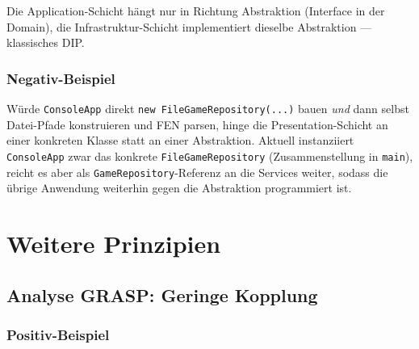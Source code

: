 \documentclass[a4paper,12pt]{article}
\let\oldsection\section
\renewcommand{\section}{\clearpage\oldsection}
\begin{document}

Die Application-Schicht hängt nur in Richtung Abstraktion (Interface in der Domain), die
Infrastruktur-Schicht implementiert dieselbe Abstraktion --- klassisches DIP.

\subsubsection*{Negativ-Beispiel}

Würde \texttt{ConsoleApp} direkt \texttt{new FileGameRepository(...)} bauen \emph{und} dann
selbst Datei-Pfade konstruieren und FEN parsen, hinge die Presentation-Schicht an einer konkreten
Klasse statt an einer Abstraktion. Aktuell instanziiert \texttt{ConsoleApp} zwar das konkrete
\texttt{FileGameRepository} (Zusammenstellung in \texttt{main}), reicht es aber als
\texttt{GameRepository}-Referenz an die Services weiter, sodass die übrige Anwendung weiterhin
gegen die Abstraktion programmiert ist.

\section{Weitere Prinzipien}

\subsection*{Analyse GRASP: Geringe Kopplung}

\subsubsection*{Positiv-Beispiel}
\end{document}
